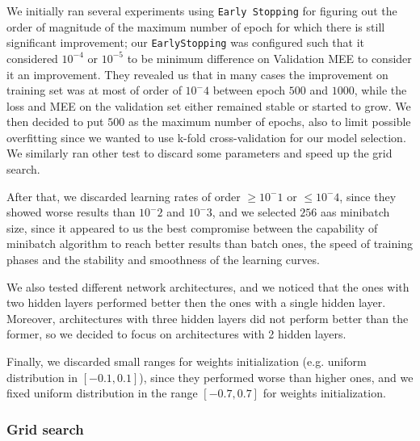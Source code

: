 We initially ran several experiments using \texttt{Early Stopping} for figuring out the order of magnitude of the maximum number of epoch for which there is still significant improvement; our \texttt{EarlyStopping} was configured such that it considered $10^{-4}$ or $10^{-5}$ to be minimum difference on Validation MEE to consider it an improvement. They revealed us that in many cases the improvement on training set was at most of order of $10^-4$ between epoch $500$ and $1000$, while the loss and MEE on the validation set either remained stable or started to grow. We then decided to put $500$ as the maximum number of epochs, also to limit possible overfitting since we wanted to use k-fold cross-validation for our model selection. We similarly ran other test to discard some parameters and speed up the grid search. 

After that, we discarded learning rates of order $ \geq 10^-1$ or $\leq 10^-4$, since they showed worse results than $10^-2$ and $10^-3$, and we selected $256$ aas minibatch size, since it appeared to us the best compromise between the capability of minibatch algorithm to reach better results than batch ones, the speed of training phases and the stability and smoothness of the learning curves.

We also tested different network architectures, and we noticed that the ones with two hidden layers performed better then the ones with a single hidden layer. Moreover, architectures with three hidden layers did not perform better than the former, so we decided to focus on architectures with 2 hidden layers.

Finally, we discarded small ranges for weights initialization (e.g. uniform distribution in $[-0.1, 0.1]$), since they performed worse than higher ones,
and we fixed uniform distribution in the range $[-0.7, 0.7]$ for weights initialization.

\subsubsection{Grid search}

